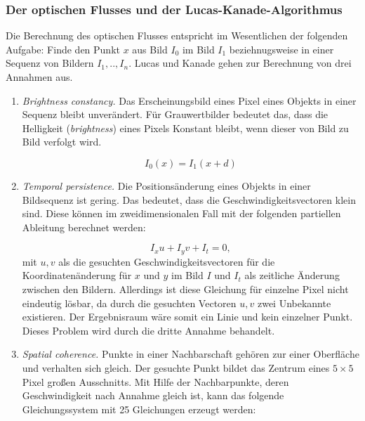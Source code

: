 	\subsubsection{Der optischen Flusses und der Lucas-Kanade-Algorithmus}
	Die Berechnung des optischen Flusses entspricht im Wesentlichen der folgenden Aufgabe: Finde den Punkt $x$ aus Bild $I_{0}$ im Bild $I_{1}$ beziehnugsweise in einer Sequenz von Bildern $I_{1},..,I_{n}$. Lucas und Kanade gehen zur Berechnung von drei Annahmen aus.

	\begin{enumerate}
	\item \textit{Brightness constancy.} Das Erscheinungsbild eines Pixel eines Objekts in einer Sequenz bleibt unverändert. Für Grauwertbilder bedeutet das, dass die Helligkeit (\textit{brightness}) eines Pixels Konstant bleibt, wenn dieser von Bild zu Bild verfolgt wird.
	
	\begin{equation}
	I_{0}(x)=I_{1}(x+d)
	\end{equation}

	\item \textit{Temporal persistence. }Die Positionsänderung eines Objekts in einer Bildsequenz ist gering. Das bedeutet, dass die Geschwindigkeitsvectoren klein sind. Diese können im zweidimensionalen Fall mit der folgenden partiellen Ableitung berechnet werden:
	
	\begin{equation} I_{x}u+I_{y}v+I_{t}=0, \end{equation}
	mit $u,v$ als die gesuchten Geschwindigkeitsvectoren für die Koordinatenänderung für $x$ und $y$ im Bild $I$ und $I_{t}$ als zeitliche Änderung zwischen den Bildern. Allerdings ist diese Gleichung für einzelne Pixel nicht eindeutig lösbar, da durch die gesuchten Vectoren $u,v$ zwei Unbekannte existieren. Der Ergebnisraum wäre somit ein Linie und kein einzelner Punkt. Dieses Problem wird durch die dritte Annahme behandelt.

	\item \textit{Spatial coherence.} Punkte in einer Nachbarschaft gehören zur einer Oberfläche und verhalten sich gleich. Der gesuchte Punkt bildet das Zentrum eines $5\times5$ Pixel großen Ausschnitts.
	Mit Hilfe der Nachbarpunkte, deren Geschwindigkeit nach Annahme gleich ist, kann das folgende Gleichungssystem mit 25 Gleichungen erzeugt werden:


\end{enumerate}
